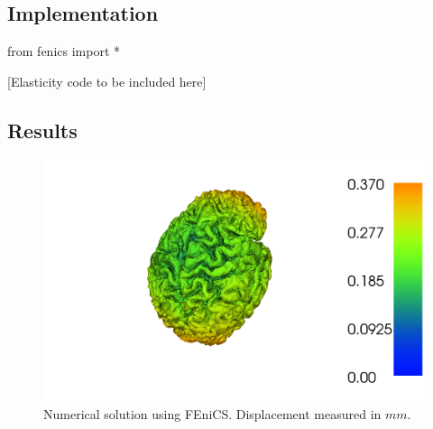 \documentclass[epsfig,11pt]{article}
\begin{document}
\subsection{Implementation}

\begin{python}
from fenics import *

[Elasticity code to be included here]

\end{python}

\subsection{Results}

 \begin{figure}[h!] 
\begin{center}
  \includegraphics[scale=0.4]{brain.png}
  \end{center}
  \caption{Numerical solution using FEniCS. Displacement measured in $mm$.}
\end{figure}



\end{document}
